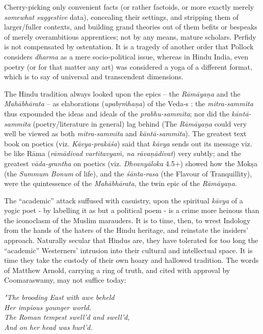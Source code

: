 Cherry-picking only convenient facts (or rather factoids, or more exactly merely {\sl somewhat suggestive} data), concealing their settings, and stripping them of larger/fuller contexts, and building grand theories out of them befits or bespeaks of merely overambitious apprentices; not by any means, mature scholars. Perfidy is not compensated by ostentation. It is a tragedy of another order that Pollock considers {\sl dharma} as a mere socio-political issue, whereas in Hindu India, even poetry (or for that matter any art) was considered a yoga of a different format, which is to say of universal and transcendent dimensions. 

The Hindu tradition always looked upon the epics -- the {\sl Rāmāyaṇa} and the {\sl Mahābhārata} -- as elaborations ({\sl upabṛṁhaṇa}) of the Veda-s : the {\sl mitra-sammita} thus expounded the ideas and ideals  of the {\sl prabhu-sammita}; nor did the {\sl kāntā-sammita} (poetry/literature in general) lag behind (The {\sl Rāmāyaṇa} could very well be viewed as both {\sl mitra-sammita} and {\sl kāntā-sammita}). The greatest text book on poetics (viz. {\sl Kāvya-prakāśa}) said that {\sl kāvya} sends out its message viz. be like Rāma ({\sl rāmādivad vartitavyaṁ, na rāvaṇādivat}) very subtly; and the greatest {\sl vāda-grantha} on poetics (viz. {\sl Dhvanyāloka} 4.5+) showed how the Mokṣa (the {\sl Summum Bonum} of life), and the {\sl śānta-rasa}  (the Flavour of Tranquillity), were the quintessence of the {\sl Mahābhārata}, the twin epic of the {\sl Rāmāyaṇa}.
 
The “academic” attack suffused with casuistry, upon the spiritual {\sl kāvya} of a yogic poet - by labelling it as but a political poem - is a crime more heinous than the iconoclasm of the Muslim marauders. It is to time, then, to wrest Indology from the hands of the haters of the Hindu heritage, and reinstate the insiders’ approach. Naturally secular that Hindus are, they have  tolerated for too long the “academic” Westerners’ intrusion into their cultural and intellectual space. It is time they take the custody of their own hoary and hallowed tradition. The words of Matthew Arnold, carrying a ring of truth, and cited with approval by Coomaraswamy, may not suffice today:

\begin{myquote}
{{\sl "The brooding East with awe beheld}}\\
{\sl Her impious younger world.}\\
{\sl The Roman tempest swell'd and swell'd,}\\
{\sl And on her head was hurl'd.}
\end{myquote}

